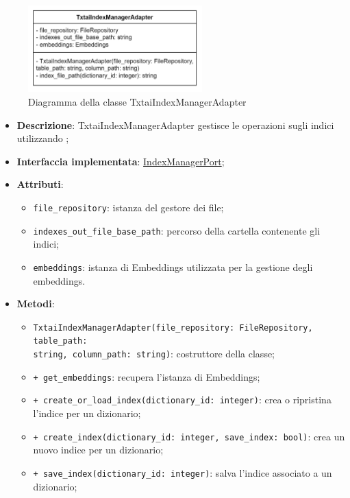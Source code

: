  \label{TxtaiIndexManagerAdapter}
\begin{figure}[H]
    \centering
    \includegraphics[width=0.6\textwidth]{assets/Backend/txtai_index_manager_adapter.png}
    \caption{Diagramma della classe TxtaiIndexManagerAdapter}
  \end{figure}
\begin{itemize}
    \item \textbf{Descrizione}: TxtaiIndexManagerAdapter gestisce le operazioni  sugli indici utilizzando ;
    \item \textbf{Interfaccia implementata}: \hyperref[IndexManagerPort]{IndexManagerPort};
    \item \textbf{Attributi}:
    \begin{itemize}
        \item \texttt{file\_repository}: istanza del gestore dei file;
        \item \texttt{indexes\_out\_file\_base\_path}: percorso della cartella contenente gli indici;
        \item \texttt{embeddings}: istanza di Embeddings utilizzata per la gestione degli embeddings.
    \end{itemize}
    \item \textbf{Metodi}:
    \begin{itemize}
        \item \texttt{TxtaiIndexManagerAdapter(file\_repository: FileRepository, table\_path:\\ string, column\_path: string)}: costruttore della classe;
        \item \texttt{+ get\_embeddings}: recupera l'istanza di Embeddings;
        \item \texttt{+ create\_or\_load\_index(dictionary\_id: integer)}: crea o ripristina l'indice per un dizionario;
        \item \texttt{+ create\_index(dictionary\_id: integer, save\_index: bool)}: crea un nuovo indice per un dizionario;
        \item \texttt{+ save\_index(dictionary\_id: integer)}: salva l'indice associato a un dizionario;

\end{itemize}
\end{itemize}
